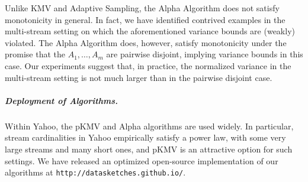 \documentclass{article}
\newcommand{\edit}[1]{{#1}}
\begin{document}
Unlike KMV and Adaptive Sampling, the Alpha Algorithm does not satisfy monotonicity in general. In fact, we have identified contrived examples
in the multi-stream setting on which the aforementioned variance bounds are (weakly) violated.
The Alpha Algorithm does, however, satisfy monotonicity under the promise that the $A_1, \dots, A_m$ are pairwise disjoint, implying variance bounds in this case. 
Our experiments suggest that, in practice, the \edit{normalized} variance in the multi-stream setting is not much larger than in the pairwise disjoint case.
\edit{\subparagraph*{Deployment of Algorithms.}  Within Yahoo, the pKMV and Alpha algorithms are used widely. In particular,
stream cardinalities in Yahoo empirically satisfy a power law, with some very large streams and many short ones, and pKMV is an attractive option for such settings. 
We have released an optimized open-source implementation of our algorithms at \texttt{http://datasketches.github.io/}.}
\end{document}
